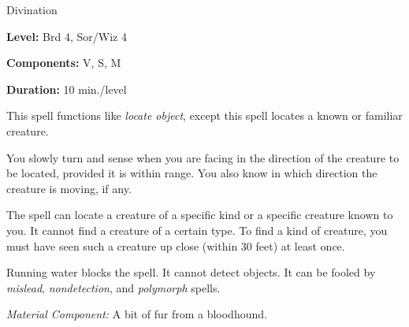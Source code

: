 
Divination

\textbf{Level:} Brd 4, Sor/Wiz 4

\textbf{Components:} V, S, M

\textbf{Duration:} 10 min./level

This spell functions like \textit{locate object}, except this spell locates a known 
or familiar creature.

You slowly turn and sense when you are facing in the direction of the creature 
to be located, provided it is within range. You also know in which direction the 
creature is moving, if any.

The spell can locate a creature of a specific kind or a specific creature known 
to you. It cannot find a creature of a certain type. To find a kind of creature, 
you must have seen such a creature up close (within 30 feet) at least once.

Running water blocks the spell. It cannot detect objects. It can be fooled by \textit{mislead}, 
\textit{nondetection}, and \textit{polymorph} spells.

\textit{Material Component:} A bit of fur from a bloodhound.

